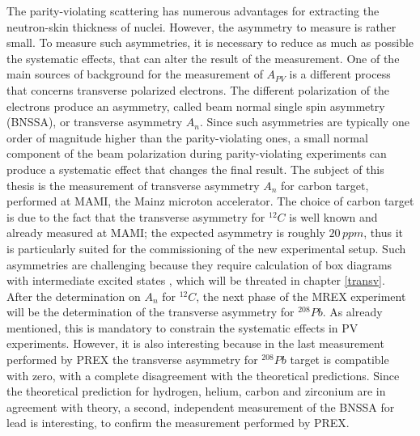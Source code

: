 The parity-violating scattering has numerous advantages for extracting the neutron-skin thickness of nuclei. However, the asymmetry to measure is rather small. To measure such asymmetries, it is necessary to reduce as much as possible the systematic effects, that can alter the result of the measurement. One of the main sources of background for the measurement of $A_{PV}$ is a different process that concerns transverse polarized electrons. The different polarization of the electrons produce an asymmetry, called beam normal single spin asymmetry (BNSSA), or transverse asymmetry $A_{n}$. Since such asymmetries are typically one order of magnitude higher than the parity-violating ones, a small normal component of the beam polarization during parity-violating experiments can produce a systematic effect that changes the final result. The subject of this thesis is the measurement of transverse asymmetry $A_{n}$ for carbon target, performed at MAMI, the Mainz microton accelerator. The choice of carbon target is due to the fact that the transverse asymmetry for $^{12}C$ is well known and already measured at MAMI; the expected asymmetry is roughly $20 \, ppm$, thus it is particularly suited for the commissioning of the new experimental setup. Such asymmetries are challenging because they require calculation of box diagrams with intermediate excited states \cite{Gorchtein_2008}, which will be threated in chapter \ref{transv}. After the determination on $A_{n}$ for $^{12}C$, the next phase of the MREX experiment will be the determination of the transverse asymmetry for $^{208}Pb$. As already mentioned, this is mandatory to constrain the systematic effects in PV experiments. However, it is also interesting because in the last measurement performed by PREX \cite{HAPPEX:2012fud} the transverse asymmetry for $^{208}Pb$ target is compatible with zero, with a complete disagreement with the theoretical predictions. Since the theoretical prediction for hydrogen, helium, carbon and zirconium are in agreement with theory, a second, independent measurement of the BNSSA for lead is interesting, to confirm the measurement performed by PREX.  
